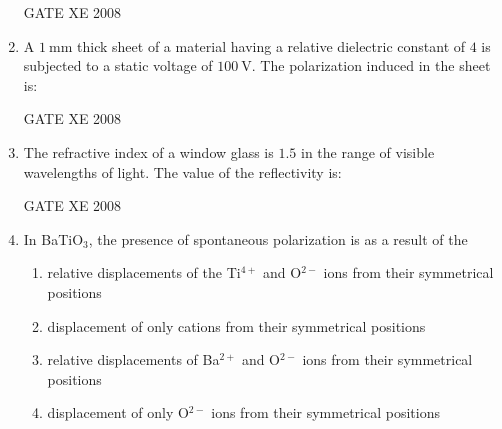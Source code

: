 \documentclass[12pt]{article}
\begin{document}
\begin{enumerate}
GATE XE 2008

\item A $1 \ \mathrm{mm}$ thick sheet of a material having a relative dielectric constant of $4$ is subjected to a static voltage of $100 \ \mathrm{V}$. The polarization induced in the sheet is:

\begin{enumerate}
\end{enumerate}

GATE XE 2008

\item The refractive index of a window glass is $1.5$ in the range of visible wavelengths of light. The value of the reflectivity is:

\begin{enumerate}
\end{enumerate}

GATE XE 2008

\item In BaTiO$_3$, the presence of spontaneous polarization is as a result of the

\begin{enumerate}

\item  relative displacements of the Ti$^{4+}$ and O$^{2-}$ ions from their symmetrical positions 
\item  displacement of only cations from their symmetrical positions
\item  relative displacements of Ba$^{2+}$ and O$^{2-}$ ions from their symmetrical positions
\item  displacement of only O$^{2-}$ ions from their symmetrical positions
\end{enumerate}


\end{enumerate}
\end{document}
